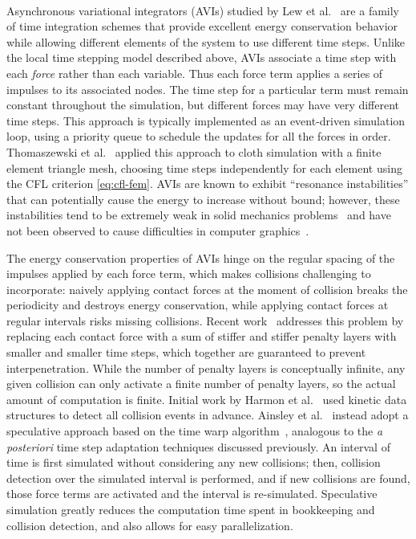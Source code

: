 \paragraph*{}
Asynchronous variational integrators (AVIs) studied by Lew et al.~\cite{Lew2004} are a family of time integration schemes that provide excellent energy conservation behavior while allowing different elements of the system to use different time steps.
Unlike the local time stepping model described above, AVIs associate a time step with each \emph{force} rather than each variable.
Thus each force term applies a series of impulses to its associated nodes.
The time step for a particular term must remain constant throughout the simulation, but different forces may have very different time steps.
This approach is typically implemented as an event-driven simulation loop, using a priority queue to schedule the updates for all the forces in order.
Thomaszewski et al.~\cite{Thomaszewski2008} applied this approach to cloth simulation with a finite element triangle mesh, choosing time steps independently for each element using the CFL criterion \eqref{eq:cfl-fem}.
AVIs are known to exhibit ``resonance instabilities'' that can potentially cause the energy to increase without bound; however, these instabilities tend to be extremely weak in solid mechanics problems~\cite{Fong2007} and have not been observed to cause difficulties in computer graphics~\cite{Harmon2009}.

The energy conservation properties of AVIs hinge on the regular spacing of the impulses applied by each force term, which makes collisions challenging to incorporate: naively applying contact forces at the moment of collision breaks the periodicity and destroys energy conservation, while applying contact forces at regular intervals risks missing collisions.
Recent work~\cite{Harmon2009,Ainsley2012} addresses this problem by replacing each contact force with a sum of stiffer and stiffer penalty layers with smaller and smaller time steps, which together are guaranteed to prevent interpenetration.
While the number of penalty layers is conceptually infinite, any given collision can only activate a finite number of penalty layers, so the actual amount of computation is finite.
Initial work by Harmon et al.~\cite{Harmon2009} used kinetic data structures to detect all collision events in advance.
Ainsley et al.~\cite{Ainsley2012} instead adopt a speculative approach based on the time warp algorithm~\cite{Jefferson1985, Mirtich2000}, analogous to the \textit{a posteriori} time step adaptation techniques discussed previously.
An interval of time is first simulated without considering any new collisions; then, collision detection over the simulated interval is performed, and if new collisions are found, those force terms are activated and the interval is re-simulated.
Speculative simulation greatly reduces the computation time spent in bookkeeping and collision detection, and also allows for easy parallelization.

